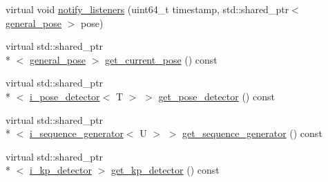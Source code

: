 \begin{DoxyCompactItemize}
virtual void \hyperlink{classmae_1_1kp__movement__detector_acdc61f7edc7fdaadb5134e6cabd04612}{notify\-\_\-listeners} (uint64\-\_\-t timestamp, std\-::shared\-\_\-ptr$<$ \hyperlink{classmae_1_1general__pose}{general\-\_\-pose} $>$ pose)
\item 
virtual std\-::shared\-\_\-ptr\\*
$<$ \hyperlink{classmae_1_1general__pose}{general\-\_\-pose} $>$ \hyperlink{classmae_1_1kp__movement__detector_a0cf1bb06689f4a983daed5a5fc1935c6}{get\-\_\-current\-\_\-pose} () const 
\item 
virtual std\-::shared\-\_\-ptr\\*
$<$ \hyperlink{classmae_1_1i__pose__detector}{i\-\_\-pose\-\_\-detector}$<$ T $>$ $>$ \hyperlink{classmae_1_1kp__movement__detector_a3ec1a3667020a0a43552c4f45d7c8967}{get\-\_\-pose\-\_\-detector} () const 
\item 
virtual std\-::shared\-\_\-ptr\\*
$<$ \hyperlink{classmae_1_1i__sequence__generator}{i\-\_\-sequence\-\_\-generator}$<$ U $>$ $>$ \hyperlink{classmae_1_1kp__movement__detector_a9335521c8d5e9a10782272bec93a8674}{get\-\_\-sequence\-\_\-generator} () const 
\item 
virtual std\-::shared\-\_\-ptr\\*
$<$ \hyperlink{classmae_1_1i__kp__detector}{i\-\_\-kp\-\_\-detector} $>$ \hyperlink{classmae_1_1kp__movement__detector_abbd7316e733802319ee2487728c008e5}{get\-\_\-kp\-\_\-detector} () const 
\end{DoxyCompactItemize}


